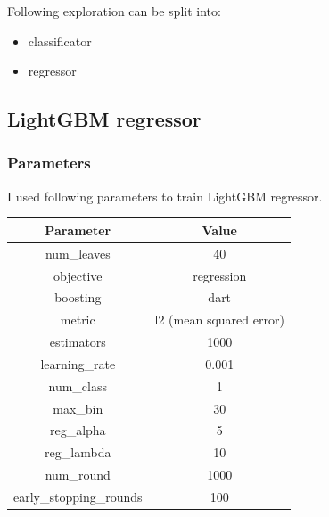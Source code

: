 \documentclass[final,2p]{elsarticle}
\begin{document}
Following exploration can be split into:

\begin{itemize}
    \item classificator
    \item regressor
\end{itemize}

\subsection{LightGBM regressor}

\subsubsection{Parameters}
I used following parameters to train LightGBM regressor. 

\begin{center}
\begin{tabular}{cc}
    Parameter & Value \\
    \hline
    num\_leaves & 40 \\
    objective & regression \\
    boosting & dart \\
    metric & l2 (mean squared error) \\
    estimators & 1000 \\
    learning\_rate & 0.001 \\
    num\_class & 1 \\
    max\_bin & 30 \\
    reg\_alpha & 5 \\
    reg\_lambda & 10 \\
    num\_round & 1000 \\
    early\_stopping\_rounds & 100 \\
\end{tabular}
\end{center}
\end{document}
